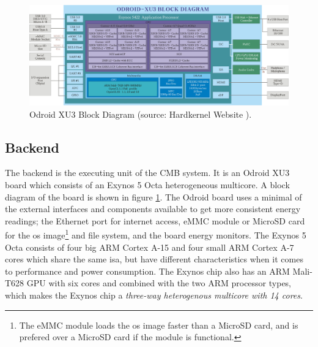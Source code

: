 \begin{figure}
    \includegraphics[width=1.0\textwidth]{figs/block-xu3.jpg}
    \caption[Odroid XU3 Block Diagram.]{Odroid XU3 Block Diagram (source: Hardkernel Website \cite{XU3-BLOCK}).}
    \label{fig:odroid-block}
\end{figure}

\subsection{Backend}
\label{subsec:cmb-arch-backend}
The backend is the executing unit of the CMB system. It is an Odroid XU3 board \cite{XU3} which consists of an Exynos 5 Octa heterogeneous multicore. A block diagram of the board is shown in figure \ref{fig:odroid-block}.  The Odroid board uses a minimal of the external interfaces and components available to get more consistent energy readings; the Ethernet port for internet access, eMMC module or MicroSD card for the \gls{os} image\footnote{The eMMC module loads the \gls{os} image faster than a MicroSD card, and is prefered over a MicroSD card if the module is functional.} and file system, and the board energy monitors. The Exynos 5 Octa consists of four big ARM Cortex A-15 and four small ARM Cortex A-7 cores which share the same \gls{isa}, but have different characteristics when it comes to performance and power consumption. The Exynos chip also has an ARM Mali-T628 GPU with six cores and combined with the two ARM processor types, which makes the Exynos chip a \textit{three-way heterogenous multicore with 14 cores}. \\


